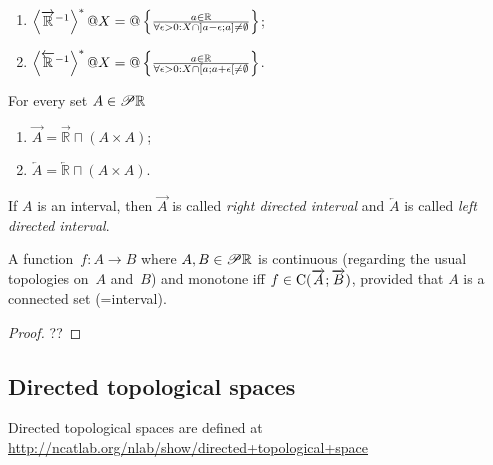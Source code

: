 \begin{xca}~
\begin{enumerate}
\item $\left\langle \overrightarrow{\mathbb{R}}^{-1}\right\rangle ^{\ast}@X = @\left\{ \frac{a\in\mathbb{R}}{\forall\epsilon>0:X\cap]a-\epsilon;a]\ne\emptyset}\right\}$;
\item $\left\langle \overleftarrow{\mathbb{R}}^{-1}\right\rangle ^{\ast}@X = @\left\{ \frac{a\in\mathbb{R}}{\forall\epsilon>0:X\cap[a;a+\epsilon[\ne\emptyset}\right\}$.
\end{enumerate}
\end{xca}

\begin{defn}
For every set $A\in\mathscr{P}\mathbb{R}$
\begin{enumerate}
\item $\overrightarrow{A} = \overrightarrow{\mathbb{R}} \sqcap(A\times A)$;
\item $\overleftarrow{A} = \overleftarrow{\mathbb{R}} \sqcap(A\times A)$.
\end{enumerate}
If $A$ is an interval, then $\overrightarrow{A}$ is called \emph{right directed interval} and $\overleftarrow{A}$ is called \emph{left directed interval}.
\end{defn}

\begin{prop}
A function~$f:A\rightarrow B$ where $A,B\in\mathscr{P}\mathbb{R}$ is continuous (regarding the usual topologies on~$A$ and~$B$) and monotone iff
$f\in\mathrm{C}(\overrightarrow{A};\overrightarrow{B})$, provided that $A$ is a connected set (=interval).
\end{prop}

\begin{proof}
??
\end{proof}

\subsection{Directed topological spaces}

Directed topological spaces are defined at\\
\url{http://ncatlab.org/nlab/show/directed+topological+space}

